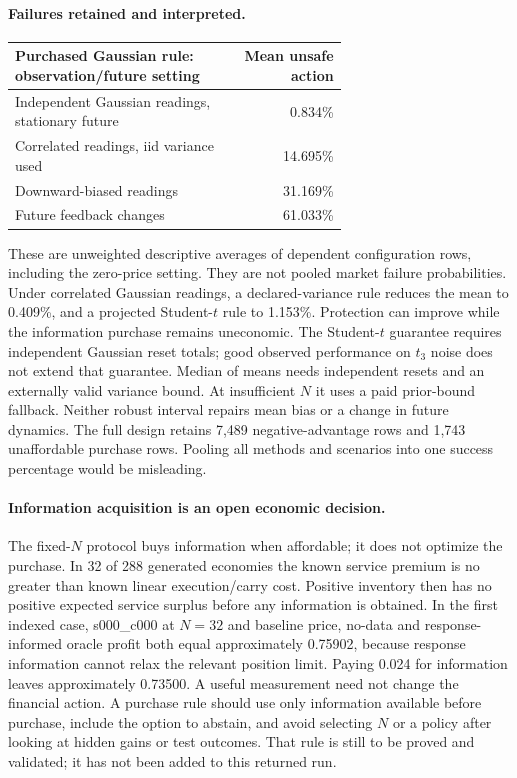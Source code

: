 \paragraph{Failures retained and interpreted.}
\begin{center}\small
\setlength{\tabcolsep}{4pt}
\begin{tabular}{@{}p{0.66\linewidth}r@{}}
\toprule
Purchased Gaussian rule: observation/future setting & Mean unsafe action\\
\midrule
Independent Gaussian readings, stationary future & 0.834\%\\
Correlated readings, iid variance used & 14.695\%\\
Downward-biased readings & 31.169\%\\
Future feedback changes & 61.033\%\\
\bottomrule
\end{tabular}
\end{center}
These are unweighted descriptive averages of dependent configuration rows,
including the zero-price setting. They are not pooled market failure
probabilities. Under correlated Gaussian readings, a declared-variance rule
reduces the mean to 0.409\%, and a projected Student-$t$ rule to 1.153\%.
Protection can improve while the information purchase remains uneconomic.
The Student-$t$ guarantee requires independent Gaussian reset totals; good
observed performance on $t_3$ noise does not extend that guarantee. Median of
means needs independent resets and an externally valid variance bound. At
insufficient $N$ it uses a paid prior-bound fallback. Neither robust interval
repairs mean bias or a change in future dynamics. The full design retains
7,489 negative-advantage rows and 1,743 unaffordable purchase rows. Pooling all
methods and scenarios into one success percentage would be misleading.

\paragraph{Information acquisition is an open economic decision.}
The fixed-$N$ protocol buys information when affordable; it does not optimize
the purchase. In 32 of 288 generated economies the known service premium is
no greater than known linear execution/carry cost. Positive inventory then has
no positive expected service surplus before any information is obtained.
In the first indexed case, s000\_c000 at $N=32$ and baseline price, no-data and
response-informed oracle profit both equal approximately 0.75902, because
response information cannot relax the relevant position limit. Paying 0.024
for information leaves approximately 0.73500. A useful measurement need not
change the financial action. A purchase rule should use only information
available before purchase, include the option to abstain, and avoid selecting
$N$ or a policy after looking at hidden gains or test outcomes. That rule is
still to be proved and validated; it has not been added to this returned run.

